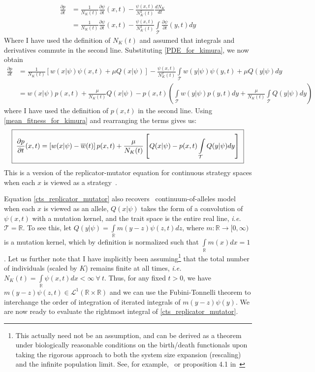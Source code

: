 \begin{align*}
\frac{\partial p}{\partial t} &= \frac{1}{N_K(t)}\frac{\partial \psi}{\partial t}(x,t) - \frac{\psi(x,t)}{N^2_K(t)}\frac{d N_K}{dt}\\
&= \frac{1}{N_K(t)}\frac{\partial \psi}{\partial t}(x,t) - \frac{\psi(x,t)}{N^2_K(t)}\int\limits_{\mathcal{T}}\frac{\partial \psi}{\partial t}(y,t)dy
\end{align*}
Where I have used the definition of $N_K(t)$ and assumed that integrals and derivatives commute in the second line. Substituting \eqref{PDE_for_kimura}, we now obtain
\begin{align*}
\frac{\partial p}{\partial t} &= \frac{1}{N_K(t)}\left[w(x|\psi)\psi(x,t) + \mu Q(x|\psi)\right] - \frac{\psi(x,t)}{N^2_K(t)}\int\limits_{\mathcal{T}}w(y|\psi)\psi(y,t) + \mu Q(y|\psi)dy\\
&= w(x|\psi)p(x,t) + \frac{\mu}{N_{K}(t)} Q(x|\psi) - p(x,t)\left(\int\limits_{\mathcal{T}}w(y|\psi)p(y,t)dy+\frac{\mu}{N_K(t)}\int\limits_{\mathcal{T}} Q(y|\psi)dy\right)
\end{align*}
where I have used the definition of $p(x,t)$ in the second line. Using \eqref{mean_fitness_for_kimura} and rearranging the terms gives us:
\begin{equation}
\label{cts_replicator_mutator}
\setlength{\fboxsep}{2\fboxsep}\boxed{\frac{\partial p}{\partial t}(x,t) = \left[w(x|\psi) - \overline{w}(t)\right]p(x,t)+\frac{\mu}{N_K(t)}\left[Q(x|\psi) - p(x,t)\int\limits_{\mathcal{T}} Q(y|\psi)dy\right]}
\end{equation}
This is a version of the replicator-mutator equation for continuous strategy spaces when each $x$ is viewed as a strategy~\citep{cressman_replicator_2014}.

Equation \eqref{cts_replicator_mutator} also recovers~ continuum-of-alleles model when each $x$ is viewed as an allele, $Q(x|\psi)$ takes the form of a convolution of $\psi(x,t)$ with a mutation kernel, and the trait space is the entire real line, \emph{i.e.} $\mathcal{T} = \mathbb{R}$. To see this, let $Q(y|\psi) = \int\limits_{\mathbb{R}}m(y-z)\psi(z,t)dz$, where $m:\mathbb{R} \to [0,\infty)$ is a mutation kernel, which by definition is normalized such that $\int\limits_{\mathbb{R}}m(x)dx = 1$. Let us further note that I have implicitly been assuming\footnote{This actually need not be an assumption, and can be derived as a theorem under biologically reasonable conditions on the birth/death functionals upon taking the rigorous approach to both the system size expansion (rescaling) and the infinite population limit. See, for example,~\citet{etheridge_introduction_2000} or proposition 4.1 in~\citet{champagnat_individual_2008}} that the total number of individuals (scaled by $K$) remains finite at all times, \emph{i.e.} $N_K(t) = \int\limits_{\mathbb
R}\psi(x,t)dx < \infty \ \forall \ t$. Thus, for any fixed $t > 0$, we have $m(y-z)\psi(z,t) \in  \mathcal{L}^{1}(\mathbb{R}\times\mathbb{R})$ and we can use the Fubini-Tonnelli theorem to interchange the order of integration of iterated integrals of $m(y-z)\psi(y)$. We are now ready to evaluate the rightmost integral of \eqref{cts_replicator_mutator}.

